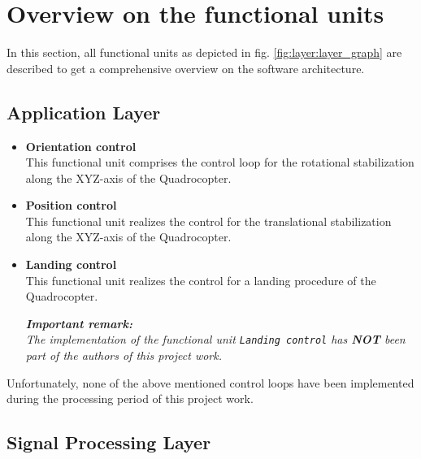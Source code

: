 \section{Overview on the functional units}
\label{sec:software:funcUnits}

In this section, all functional units as depicted in fig. \ref{fig:layer:layer_graph} are described to get a comprehensive overview on the software architecture.

\subsection{Application Layer}
\label{sec:software:funcUnits:app}

\begin{itemize}
	\item \textbf{Orientation control}\\
	This functional unit comprises the control loop for the rotational stabilization along the XYZ-axis of the Quadrocopter.
	
	\item \textbf{Position control}\\
	This functional unit realizes the control for the translational stabilization along the XYZ-axis of the Quadrocopter.
	
	\item \textbf{Landing control}\\
	This functional unit realizes the control for a landing procedure of the Quadrocopter.
	
	\textit{\textbf{Important remark:}\\
	The implementation of the functional unit \texttt{Landing control} has \textbf{NOT} been part of the authors of this project work.}
\end{itemize}

Unfortunately, none of the above mentioned control loops have been implemented during the processing period of this project work.
\subsection{Signal Processing Layer}
\label{sec:software:funcUnits:sig}

